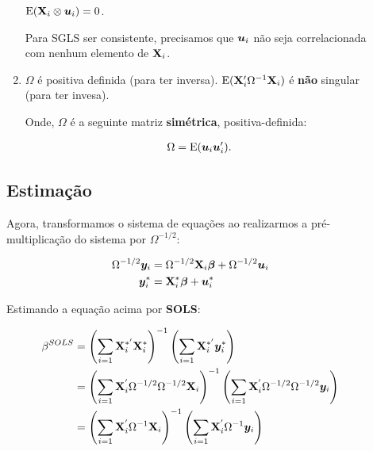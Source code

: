 \documentclass[11pt, oneside, a4paper, article]{article}
\numberwithin{equation}{section}
\begin{document}
\begin{description}
\begin{enumerate}
$\text{E}(\mathbf{X}_{i} \otimes \boldsymbol{u}_{i}) = 0$.

Para SGLS ser consistente, precisamos que $\boldsymbol{u}_{i}$ não seja correlacionada com nenhum elemento de $\mathbf{X}_{i}$.

\item %

$\Omega$ é positiva definida (para ter inversa).
$\text{E}(\mathbf{X}_{i}^{\prime} \Omega^{-1} \mathbf{X}_{i})$ é \textbf{não} singular (para ter invesa).

Onde, $\Omega$ é a seguinte matriz \textbf{simétrica}, positiva-definida:

\vspace{-1.5 em}
\begin{align*}
\Omega = \text{E}(\boldsymbol{u}_{i} \boldsymbol{u}_{i}^{\prime}).
\end{align*}
\end{enumerate}

\subsection{Estimação}

Agora, transformamos o sistema de equações ao realizarmos a pré-multiplicação do sistema por $\Omega^{-1/2}$:

\vspace{-1.5 em}
\begin{align*}
\Omega^{-1/2} \boldsymbol{y}_{i} 
&=
\Omega^{-1/2} \mathbf{X}_{i} \boldsymbol{\beta}
+
\Omega^{-1/2} \boldsymbol{u}_{i}
\\
\boldsymbol{y}_{i}^{*}
&=
\mathbf{X}_{i}^{*} \boldsymbol{\beta}
+
\boldsymbol{u}^{*}_{i}
\end{align*}

Estimando a equação acima por \textbf{SOLS}:

\vspace{-1.5 em}
\begin{align*}
\beta^{SOLS}
&=
\left( \sum_{i=1} \mathbf{X}_{i}^{*'} \mathbf{X}_{i}^{*} \right)^{-1}
\left( \sum_{i=1} \mathbf{X}_{i}^{*'} \boldsymbol{y}_{i}^{*} \right)
\\
&=
\left( \sum_{i=1} \mathbf{X}_{i}^{'} \Omega^{-1/2} \Omega^{-1/2} \mathbf{X}_{i} \right)^{-1}
\left( \sum_{i=1} \mathbf{X}_{i}^{'} \Omega^{-1/2} \Omega^{-1/2} \boldsymbol{y}_{i} \right)
\\
&=
\left( \sum_{i=1} \mathbf{X}_{i}^{'} \Omega^{-1} \mathbf{X}_{i} \right)^{-1}
\left( \sum_{i=1} \mathbf{X}_{i}^{'} \Omega^{-1} \boldsymbol{y}_{i} \right)
\end{align*}


\clearpage

\end{description}
\end{document}
